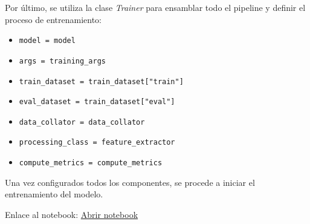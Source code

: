Por último, se utiliza la clase \textit{Trainer} para ensamblar todo el pipeline y definir el proceso de entrenamiento:

\begin{itemize}
 \item \texttt{model = model}
 \item \texttt{args = training\_args}
 \item \texttt{train\_dataset = train\_dataset["train"]}
 \item \texttt{eval\_dataset = train\_dataset["eval"]}
 \item \texttt{data\_collator = data\_collator}
 \item \texttt{processing\_class = feature\_extractor}
 \item \texttt{compute\_metrics = compute\_metrics}
\end{itemize}

Una vez configurados todos los componentes, se procede a iniciar el entrenamiento del modelo.

Enlace al notebook: \href{run:../Modelos/Iván/fine-tunning-Wav2Vec.ipynb}{Abrir notebook}